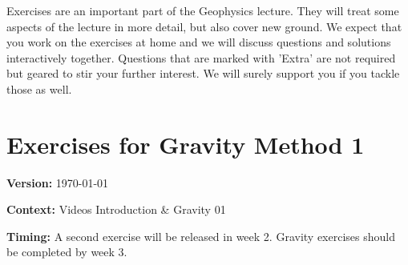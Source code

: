 \documentclass[a4paper,12pt]{article}
\begin{document}
\begin{tcolorbox}[enhanced jigsaw,breakable,pad at break*=1mm,
    colback=blue!5!white,colframe=burgundy,title=Expectations for Exercises]
    Exercises are an important part of the Geophysics lecture. They will treat some aspects of the lecture in more detail, but also cover new ground. We expect that you work on the exercises at home and we will discuss questions and solutions interactively together. Questions that are marked with 'Extra' are not required but geared to stir
     your further interest. We will surely support you if you tackle those as well. 
\end{tcolorbox}

\section{Exercises for Gravity Method 1}
\textbf{Version:} \today 

\textbf{Context:} Videos Introduction \& Gravity 01

\textbf{Timing:} A second exercise will be released in week 2. Gravity exercises should be completed by week 3.

  
  
  



%   
%   
%   


\end{document}
